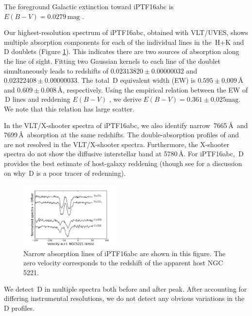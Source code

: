 \documentclass[twocolumn]{aastex61}
\begin{document}
The foreground Galactic extinction toward iPTF16abc
is $E(B-V)=0.0279\,\mathrm{mag}$ \citep{2011ApJ...737..103S}.

Our highest-resolution spectrum of iPTF16abc, obtained with VLT/UVES, shows multiple absorption components for each of the individual lines in the \,H$+$K and \,D doublets (Figure \ref{fig:narrow_features}). This indicates there are two sources of absorption along the line of sight. Fitting
two Gaussian kernels to each line of the  doublet
simultaneously leads to redshifts of $0.02313820\pm0.00000032$ and
$0.02322408\pm0.00000033$. The total \,D equivalent width (EW) is $0.595\pm0.009\,\textrm{\AA}$ and
$0.609\pm0.008\,\textrm{\AA}$, respectively. Using the empirical
relation between the EW of \,D lines and
reddening $E(B-V)$ \citep{2012MNRAS.426.1465P}, we derive
$E(B-V)=0.361\pm0.025\textrm{mag}$. We note that this relation has large scatter.

In the VLT/X-shooter spectra of iPTF16abc, we also identify narrow \,7665\,\AA\ and 7699\,\AA\ absorption at the same
redshifts. The double-absorption profiles of 
and  are not resolved in the VLT/X-shooter spectra. Furthermore, the X-shooter spectra do not show the diffusive
interstellar band at 5780\,\AA. For iPTF16abc, \,D provides the best estimate of host-galaxy reddening (though see \citealt{2013ApJ...779...38P} for a discussion on why \,D is a poor tracer of redenning).

\begin{figure}[htb]
  \centering
  \includegraphics[width=0.45\textwidth]{narrow_abs_features.pdf}
  \caption{Narrow absorption lines of iPTF16abc are shown in this
    figure. The zero velocity corresponds to the redshift of the
    apparent host NGC\,5221.}
  \label{fig:narrow_features}
\end{figure}

We detect \,D in multiple spectra both before and after peak. After accounting for differing instrumental resolutions, we do not detect any obvious variations in the \,D profiles.
\end{document}
